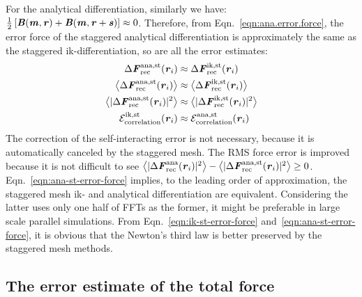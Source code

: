 \documentclass[aps,pre,preprint,unsortedaddress]{revtex4}
\renewcommand{\v}[1]{\textbf{\textit{#1}}}
\begin{document}
For the analytical differentiation, similarly we have: $\frac12\,[\v
B(\v m,\v r) + \v B(\v m, \v r+\v s)] \approx 0$. Therefore, from
Eqn.~\eqref{eqn:ana.error.force}, the error force of the staggered
analytical differentiation is approximately the same as the staggered
ik-differentiation, so are all the error estimates:
\begin{align}\label{eqn:ana-st-error-force}
  \Delta\v F^{\textrm{ana,st}}_{\textrm{rec}}(\v r_i)
  &\approx
  \Delta\v F^{\textrm{ik,st}}_{\textrm{rec}}(\v r_i)\\
  \big\langle
  \Delta\v F_{\textrm{rec}}^{\textrm{ana,st}}(\v r_i)
  \big\rangle
  &\approx
  \big\langle
  \Delta\v F_{\textrm{rec}}^{\textrm{ik,st}}(\v r_i)
  \big\rangle\\
  \big\langle
  \vert\Delta\v F_{\textrm{rec}}^{\textrm{ana,st}}(\v r_i)\vert^2
  \big\rangle
  &\approx
  \big\langle
  \vert\Delta\v F_{\textrm{rec}}^{\textrm{ik,st}}(\v r_i)\vert^2
  \big\rangle\\
  \mathcal E^{\textrm{ik,st}}_{\textrm{correlation}}(\v r_i)
  &\approx
  \mathcal E^{\textrm{ana,st}}_{\textrm{correlation}}(\v r_i)
\end{align}
The correction of the self-interacting error is not necessary,
because it is automatically canceled by the staggered mesh.
The RMS force error is improved because it is not
difficult to see 
$\big\langle\vert\Delta\v F_{\textrm{rec}}^{\textrm{ana}}(\v r_i)\vert^2\big\rangle -
\big\langle\vert\Delta\v F_{\textrm{rec}}^{\textrm{ana,st}}(\v r_i)\vert^2\big\rangle
\geq 0$.
Eqn.~\eqref{eqn:ana-st-error-force} implies, to the
leading order of approximation, the staggered
mesh ik- and analytical differentiation
are equivalent. Considering the latter uses
only one half of  FFTs as the former, it might be preferable
in large scale parallel simulations.
From Eqn.~\eqref{eqn:ik-st-error-force}
and~\eqref{eqn:ana-st-error-force}, it is obvious that the Newton's
third law is better preserved by the staggered mesh methods.



\subsection{The error estimate of the total force}
\end{document}
